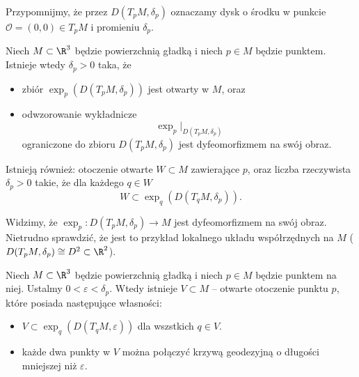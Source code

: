 Przypomnijmy, że przez $D(T_pM,\delta_p)$ oznaczamy dysk o środku w punkcie $\mathcal{O}=(0,0)\in T_pM$ i promieniu $\delta_p$.

\begin{frame}


\begin{lemat}
Niech $M\subset \R^3$ będzie powierzchnią gładką i niech $p\in M$ będzie punktem. 
Istnieje wtedy $\delta_{p}>0$ taka, że 
\begin{itemize} 
\item zbiór $\exp_p(D(T_pM,\delta_p))$ jest otwarty w $M$, oraz
\pause \item odwzorowanie wykładnicze \[\exp_p\big|_{D(T_pM,\delta_p)}\] ograniczone do zbioru $D(T_pM,\delta_p)$ jest dyfeomorfizmem na swój obraz.
\end{itemize}
\end{lemat}

\pause
\begin{lemat}
Istnieją również: otoczenie otwarte $W\subset M$ zawierające $p$, oraz liczba rzeczywista $\delta_p>0$ takie, że dla każdego $q\in W$ \[W\subset\exp_q(D(T_qM,\delta_p)).\]
\end{lemat}

\end{frame}
\begin{frame}


\begin{uwaga}
Widzimy, że $\exp_p\colon D(T_pM,\delta_p)\to M$ jest dyfeomorfizmem na swój obraz. Nietrudno sprawdzić, że jest to przykład lokalnego układu współrzędnych na $M$ ($D(T_pM,\delta_p)\cong D^2\subset \R^2$). 
\end{uwaga}

\pause\begin{wniosek}
Niech $M\subset\R^3$ będzie powierzchnią gładką i niech $p\in M$ będzie punktem na niej. Ustalmy $0<\varepsilon<\delta_p$. Wtedy istnieje $V\subset M$ -- otwarte otoczenie punktu $p$, które posiada następujące własności:
\begin{itemize}
\item $V\subset \exp_q(D(T_qM,\varepsilon))$ dla wszstkich $q\in V$.
\pause \item każde dwa punkty w $V$ można połączyć krzywą geodezyjną o długości mniejszej niż $\varepsilon$.
\end{itemize}
\end{wniosek}

\end{frame}
